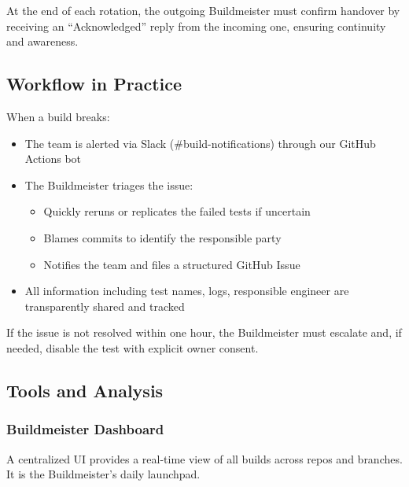 \documentclass{article}
\begin{document}
At the end of each rotation, the outgoing Buildmeister must confirm handover by receiving
an ``Acknowledged'' reply from the incoming one, ensuring continuity and
awareness.

\subsection{Workflow in Practice}
\label{workflow-in-practice}

When a build breaks:

\begin{itemize}

  \item The team is alerted via Slack (\#build-notifications) through our GitHub
    Actions bot

  \item The Buildmeister triages the issue:

    \begin{itemize}

      \item Quickly reruns or replicates the failed tests if uncertain

      \item Blames commits to identify the responsible party

      \item Notifies the team and files a structured GitHub Issue
    \end{itemize}

  \item All information including test names, logs, responsible engineer are transparently
    shared and tracked
\end{itemize}

If the issue is not resolved within one hour, the Buildmeister must escalate and,
if needed, disable the test with explicit owner consent.

\subsection{Tools and Analysis}
\label{tools-and-analysis}

\subsubsection{Buildmeister Dashboard}
\label{buildmeister-dashboard}

A centralized UI provides a real-time view of all builds across repos and branches.
It is the Buildmeister's daily launchpad.
\end{document}
